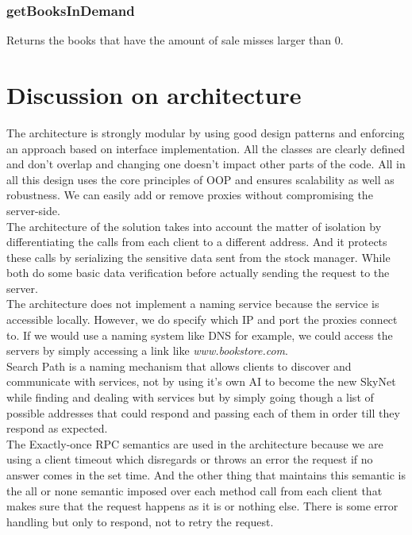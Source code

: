 \documentclass{article}      %
\begin{document}
\subsubsection*{getBooksInDemand}
Returns the books that have the amount of sale misses larger than 0.\\

\section*{Discussion on architecture}

The architecture is strongly modular by using good design patterns and enforcing an approach based on interface implementation. All the classes are clearly defined and don't overlap and changing one doesn't impact other parts of the code. All in all this design uses the core principles of OOP and ensures scalability as well as robustness. We can easily add or remove proxies without compromising the server-side.\\

The architecture of the solution takes into account the matter of isolation by differentiating the calls from each client to a different address. And it protects these calls by serializing the sensitive data sent from the stock manager. While both do some basic data verification before actually sending the request to the server.\\

The architecture does not implement a naming service because the service is accessible locally. However, we do specify which IP and port the proxies connect to. If we would use a naming system like DNS for example, we could access the servers by simply accessing a link like \emph{www.bookstore.com}.\\

Search Path is a naming mechanism that allows clients to discover and communicate with services, not by using it's own AI to become the new SkyNet while finding and dealing with services but by simply going though a list of possible addresses that could respond and passing each of them in order till they respond as expected.\\

The Exactly-once RPC semantics are used in the architecture because we are using a client timeout which disregards or throws an error the request if no answer comes in the set time. And the other thing that maintains this semantic is the all or none semantic imposed over each method call from each client that makes sure that the request happens as it is or nothing else. There is some error handling but only to respond, not to retry the request.\\
\end{document}
